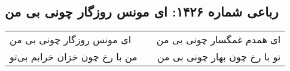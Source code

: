 \begin{center}
\section*{رباعی شماره ۱۴۲۶: ای مونس روزگار چونی بی من}
\label{sec:1426}
\begin{longtable}{l p{0.5cm} r}
ای مونس روزگار چونی بی من
&&
ای همدم غمگسار چونی بی من
\\
من با رخ چون خزان خرابم بی‌تو
&&
تو با رخ چون بهار چونی بی من
\\
\end{longtable}
\end{center}

